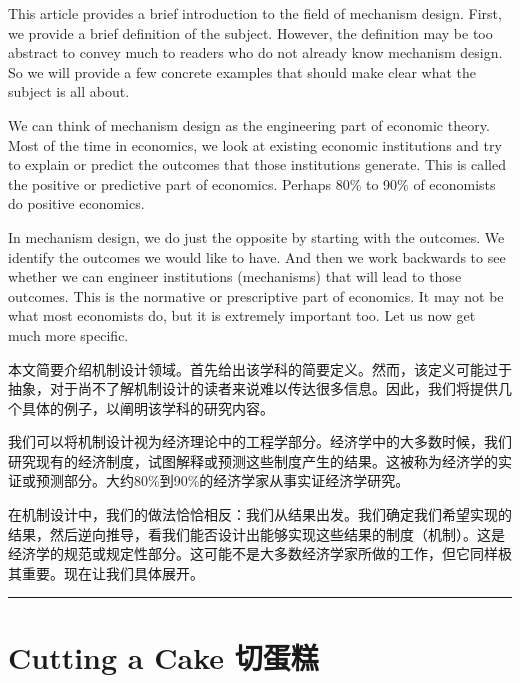 \documentclass[12pt,a4paper]{article}
\newenvironment{original}{%
  \par\vspace{4pt}\noindent%
  \color{black}%
  \ignorespaces
}{%
  \par\vspace{2pt}%
}
\newenvironment{translation}{%
  \par\vspace{2pt}\noindent%
  \color{transblue}%
  \ignorespaces
}{%
  \par\vspace{4pt}\hrule\vspace{6pt}%
}
\begin{document}
\begin{original}
This article provides a brief introduction to the field of mechanism design. First, we provide a brief definition of the subject. However, the definition may be too abstract to convey much to readers who do not already know mechanism design. So we will provide a few concrete examples that should make clear what the subject is all about.

We can think of mechanism design as the engineering part of economic theory. Most of the time in economics, we look at existing economic institutions and try to explain or predict the outcomes that those institutions generate. This is called the positive or predictive part of economics. Perhaps 80\% to 90\% of economists do positive economics.

In mechanism design, we do just the opposite by starting with the outcomes. We identify the outcomes we would like to have. And then we work backwards to see whether we can engineer institutions (mechanisms) that will lead to those outcomes. This is the normative or prescriptive part of economics. It may not be what most economists do, but it is extremely important too. Let us now get much more specific.
\end{original}
\begin{translation}
本文简要介绍机制设计领域。首先给出该学科的简要定义。然而，该定义可能过于抽象，对于尚不了解机制设计的读者来说难以传达很多信息。因此，我们将提供几个具体的例子，以阐明该学科的研究内容。

我们可以将机制设计视为经济理论中的工程学部分。经济学中的大多数时候，我们研究现有的经济制度，试图解释或预测这些制度产生的结果。这被称为经济学的实证或预测部分。大约80\%到90\%的经济学家从事实证经济学研究。

在机制设计中，我们的做法恰恰相反：我们从结果出发。我们确定我们希望实现的结果，然后逆向推导，看我们能否设计出能够实现这些结果的制度（机制）。这是经济学的规范或规定性部分。这可能不是大多数经济学家所做的工作，但它同样极其重要。现在让我们具体展开。
\end{translation}

\section{Cutting a Cake \hfill 切蛋糕}
\end{document}
